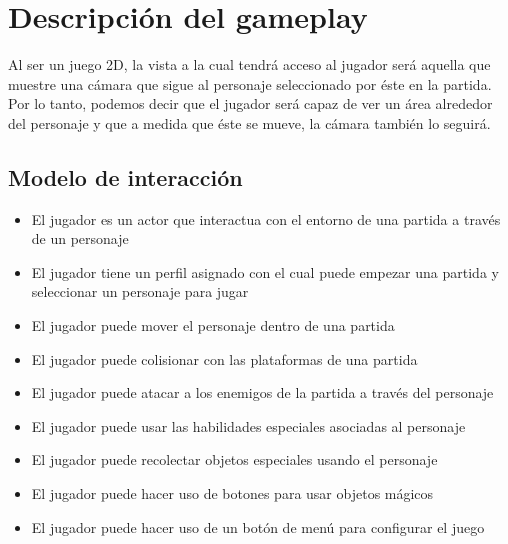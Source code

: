 \section{Descripción del gameplay} %



Al ser un juego 2D, la vista a la cual tendrá acceso al jugador será aquella que
muestre una cámara que sigue al personaje seleccionado por éste en la partida.
Por lo tanto, podemos decir que el jugador será capaz de ver un área alrededor
del personaje y que a medida que éste se mueve, la cámara también lo seguirá.

\subsection{Modelo de interacción}


\begin{itemize}
    \item El jugador es un actor que interactua con el entorno de una partida a
    través de un personaje
    \item El jugador tiene un perfil asignado con el cual puede empezar una
    partida y seleccionar un personaje para jugar
    \item El jugador puede mover el personaje dentro de una partida
    \item El jugador puede colisionar con las plataformas de una partida
    \item El jugador puede atacar a los enemigos de la partida a través del
    personaje
    \item El jugador puede usar las habilidades especiales asociadas al
    personaje
    \item El jugador puede recolectar objetos especiales usando el personaje
    \item El jugador puede hacer uso de botones para usar objetos mágicos
    \item El jugador puede hacer uso de un botón de menú para configurar el
    juego
\end{itemize}

